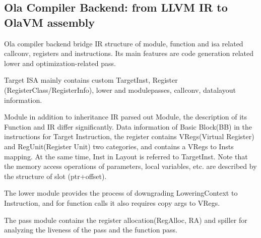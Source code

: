 \subsection{Ola Compiler Backend: from LLVM IR to OlaVM assembly}

Ola compiler backend bridge IR structure of module, function and isa related callconv, registers and instructions.
Its main features are code generation related lower and optimization-related pass.

Target ISA mainly contains custom TargetInst, Register (RegisterClass/RegisterInfo), lower and modulepasses, callconv, datalayout information.

Module in addition to inheritance IR parsed out Module, the description of its Function and IR differ significantly.
Data information of Basic Block(BB) in the instructions for Target Instruction, the register contains VRegs(Virtual Register) and RegUnit(Register Unit) two categories, and contains a VRegs to Insts mapping.
At the same time, Inst in Layout is referred to TargetInst. Note that the memory access operations of parameters, local variables, etc. are described by the structure of slot (ptr+offset).

The lower module provides the process of downgrading LoweringContext to Instruction, and for function calls it also requires copy args to VRegs.

The pass module contains the register allocation(RegAlloc, RA) and spiller for analyzing the liveness of the pass and the function pass.










